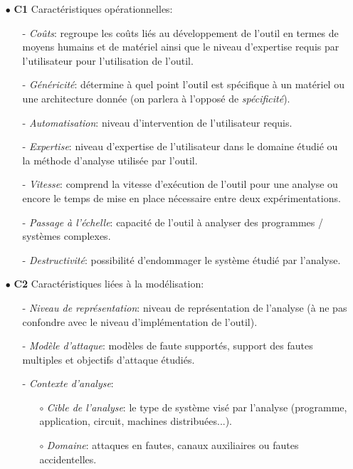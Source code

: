             \begin{itemize}
                \item[$\bullet$] \textbf{C1} Caractéristiques opérationnelles:
                \begin{itemize}
                    \item[-] \textit{Coûts}: regroupe les coûts liés au développement de l'outil en termes de moyens humains et de matériel ainsi que le niveau d'expertise requis par l'utilisateur pour l'utilisation de l'outil. 
                    \item[-] \textit{Généricité}: détermine à quel point l'outil est spécifique à un matériel ou une architecture donnée (on parlera à l'opposé de \textit{spécificité}).
                    \item[-] \textit{Automatisation}: niveau d'intervention de l'utilisateur requis.
                    \item[-] \textit{Expertise}: niveau d'expertise de l'utilisateur dans le domaine étudié ou la méthode d'analyse utilisée par l'outil. 
                    \item[-] \textit{Vitesse}:  comprend la vitesse d'exécution de l'outil pour une analyse ou encore le temps de mise en place nécessaire entre deux expérimentations. 
                    \item[-] \textit{Passage à l'échelle}: capacité de l'outil à analyser des programmes / systèmes complexes.
                    \item[-] \textit{Destructivité}: possibilité d'endommager le système étudié par l'analyse.
                \end{itemize}
                
                \item[$\bullet$] \textbf{C2} Caractéristiques liées à la modélisation:
                \begin{itemize}
                    \item[-] \textit{Niveau de représentation}: niveau de représentation de l'analyse (à ne pas confondre avec le niveau d'implémentation de l'outil).
                    \item[-] \textit{Modèle d'attaque}: modèles de faute supportés, support des fautes multiples et objectifs d'attaque étudiés.
                    \item[-] \textit{Contexte d'analyse}: 
                    \begin{itemize}
                        \item[$\circ$] \textit{Cible de l'analyse}: le type de système visé par l'analyse (programme, application, circuit, machines distribuées...).
                        \item[$\circ$] \textit{Domaine}: attaques en fautes, canaux auxiliaires ou fautes accidentelles.
                    \end{itemize}
                \end{itemize}                
                

\end{itemize}
